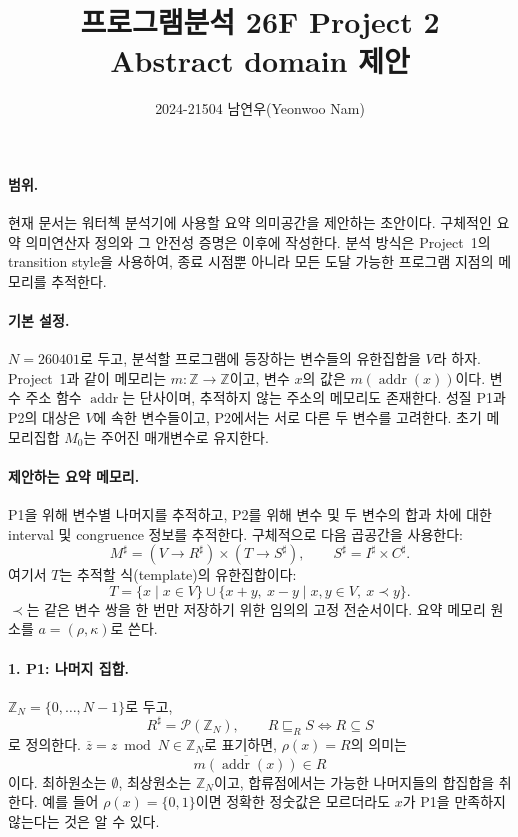 \documentclass[a4paper,10pt]{article}
\title{프로그램분석 26F Project 2\\[2pt]
  \large Abstract domain 제안}
\author{2024-21504 남연우(Yeonwoo Nam)}
\date{}
\newcommand{\ps}[1]{\mathcal P(#1)}
\newcommand{\addr}{\operatorname{addr}}
\newcommand{\Msharp}{M^\sharp}
\newcommand{\Rsharp}{R^\sharp}
\newcommand{\Isharp}{I^\sharp}
\newcommand{\Csharp}{C^\sharp}
\newcommand{\Ssharp}{S^\sharp}
\newcommand{\remN}[1]{\overline{#1}}
\begin{document}
\maketitle

\paragraph{범위.}
현재 문서는 워터첵 분석기에 사용할 요약 의미공간을 제안하는 초안이다.
구체적인 요약 의미연산자 정의와 그 안전성 증명은 이후에 작성한다.
분석 방식은 Project~1의 transition style을 사용하여,
종료 시점뿐 아니라 모든 도달 가능한 프로그램 지점의 메모리를 추적한다.

\paragraph{기본 설정.}
$N=260401$로 두고, 분석할 프로그램에 등장하는 변수들의 유한집합을 $V$라 하자.
Project~1과 같이 메모리는 $m:\mathbb Z\to\mathbb Z$이고,
변수 $x$의 값은 $m(\addr(x))$이다.
변수 주소 함수 $\addr$는 단사이며, 추적하지 않는 주소의 메모리도 존재한다.
성질 P1과 P2의 대상은 $V$에 속한 변수들이고, P2에서는 서로 다른 두 변수를 고려한다.
초기 메모리집합 $M_0$는 주어진 매개변수로 유지한다.

\paragraph{제안하는 요약 메모리.}
P1을 위해 변수별 나머지를 추적하고,
P2를 위해 변수 및 두 변수의 합과 차에 대한 interval 및 congruence 정보를 추적한다.
구체적으로 다음 곱공간을 사용한다:
\[
 \boxed{
 \Msharp=(V\to\Rsharp)\times(T\to\Ssharp),
 \qquad \Ssharp=\Isharp\times\Csharp.
 }
\]
여기서 $T$는 추적할 식(template)의 유한집합이다:
\[
 T=\{x\mid x\in V\}
   \cup\{x+y,\ x-y\mid x,y\in V,\ x\prec y\}.
\]
$\prec$는 같은 변수 쌍을 한 번만 저장하기 위한 임의의 고정 전순서이다.
요약 메모리 원소를 $a=(\rho,\kappa)$로 쓴다.

\paragraph{1. P1: 나머지 집합.}
$\mathbb Z_N=\{0,\ldots,N-1\}$로 두고,
\[
 \Rsharp=\ps{\mathbb Z_N},\qquad
 R\sqsubseteq_R S\iff R\subseteq S
\]
로 정의한다. $\remN{z}=z\bmod N\in\mathbb Z_N$로 표기하면,
$\rho(x)=R$의 의미는
\[
 \remN{m(\addr(x))}\in R
\]
이다. 최하원소는 $\emptyset$, 최상원소는 $\mathbb Z_N$이고,
합류점에서는 가능한 나머지들의 합집합을 취한다.
예를 들어 $\rho(x)=\{0,1\}$이면 정확한 정숫값은 모르더라도
$x$가 P1을 만족하지 않는다는 것은 알 수 있다.
\end{document}
